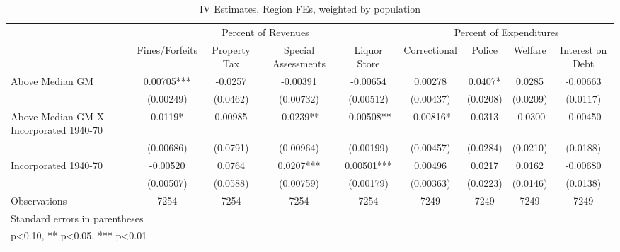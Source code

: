 \begin{table}[htbp]\centering
\def\sym#1{\ifmmode^{#1}\else\(^{#1}\)\fi}
\caption{IV Estimates, Region FEs, weighted by population}
\begin{tabular}{l*{8}{c}}
\toprule
                    &\multicolumn{4}{c}{Percent of Revenues}                        &\multicolumn{4}{c}{Percent of Expenditures}                    \\\cmidrule(lr){2-5}\cmidrule(lr){6-9}
                    &\multicolumn{1}{c}{Fines/Forfeits}&\multicolumn{1}{c}{Property Tax}&\multicolumn{1}{c}{Special Assessments}&\multicolumn{1}{c}{Liquor Store}&\multicolumn{1}{c}{Correctional}&\multicolumn{1}{c}{Police}&\multicolumn{1}{c}{Welfare}&\multicolumn{1}{c}{Interest on Debt}\\
\midrule
Above Median GM     &     0.00705***&     -0.0257   &    -0.00391   &    -0.00654   &     0.00278   &      0.0407*  &      0.0285   &    -0.00663   \\
                    &   (0.00249)   &    (0.0462)   &   (0.00732)   &   (0.00512)   &   (0.00437)   &    (0.0208)   &    (0.0209)   &    (0.0117)   \\
\addlinespace
Above Median GM X Incorporated 1940-70&      0.0119*  &     0.00985   &     -0.0239** &    -0.00508** &    -0.00816*  &      0.0313   &     -0.0300   &    -0.00450   \\
                    &   (0.00686)   &    (0.0791)   &   (0.00964)   &   (0.00199)   &   (0.00457)   &    (0.0284)   &    (0.0210)   &    (0.0188)   \\
\addlinespace
Incorporated 1940-70&    -0.00520   &      0.0764   &      0.0207***&     0.00501***&     0.00496   &      0.0217   &      0.0162   &    -0.00680   \\
                    &   (0.00507)   &    (0.0588)   &   (0.00759)   &   (0.00179)   &   (0.00363)   &    (0.0223)   &    (0.0146)   &    (0.0138)   \\
\midrule
Observations        &        7254   &        7254   &        7254   &        7254   &        7249   &        7249   &        7249   &        7249   \\
\bottomrule
\multicolumn{9}{l}{\footnotesize Standard errors in parentheses}\\
\multicolumn{9}{l}{\footnotesize * p<0.10, ** p<0.05, *** p<0.01}\\
\end{tabular}
\end{table}
